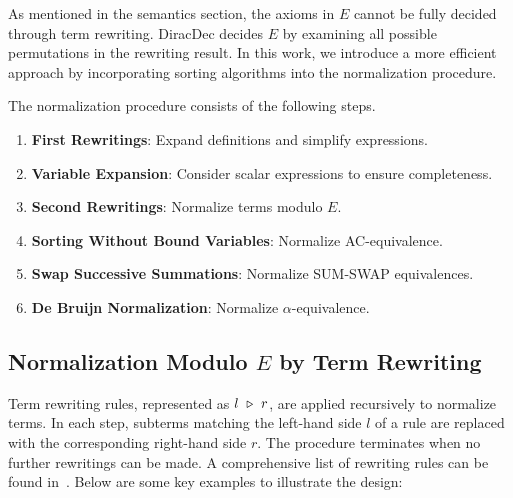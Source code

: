 \documentclass[runningheads]{llncs}
\begin{document}
As mentioned in the semantics section, the axioms in \( E \) cannot be fully decided through term rewriting. DiracDec decides \( E \) by examining all possible permutations in the rewriting result. In this work, we introduce a more efficient approach by incorporating sorting algorithms into the normalization procedure. 

The normalization procedure consists of the following steps.
\begin{enumerate}
    \item \textbf{First Rewritings}: Expand definitions and simplify expressions.
    \item \textbf{Variable Expansion}: Consider scalar expressions to ensure completeness.
    \item \textbf{Second Rewritings}: Normalize terms modulo \( E \).
    \item \textbf{Sorting Without Bound Variables}: Normalize AC-equivalence.
    \item \textbf{Swap Successive Summations}: Normalize SUM-SWAP equivalences.
    \item \textbf{De Bruijn Normalization}: Normalize \( \alpha \)-equivalence.
\end{enumerate}

\subsection{Normalization Modulo \( E \) by Term Rewriting}

Term rewriting rules, represented as \( l \ \reduce\ r \), are applied recursively to normalize terms. In each step, subterms matching the left-hand side \( l \) of a rule are replaced with the corresponding right-hand side \( r \). The procedure terminates when no further rewritings can be made.
A comprehensive list of rewriting rules can be found in~. Below are some key examples to illustrate the design:
\end{document}
